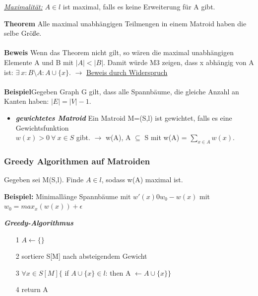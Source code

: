 \underline{\textit{Maximalität:}} $A \in l$ ist maximal, falls es keine Erweiterung für A gibt. \newline

\textbf{Theorem} \newline Alle maximal unabhängigen Teilmengen in einem Matroid haben die selbe Größe.
\\\\
\textbf{Beweis} \newline Wenn das Theorem nicht gilt, so wären die maximal unabhängigen Elemente A und B mit $|A| < |B|$. Damit würde M3 zeigen, dass x abhängig von A ist: $\exists\ x: B\setminus A: A \cup \{x\}$. $\rightarrow$ \underline{Beweis durch Widerspruch}
\\\\
\textbf{Beispiel}\newline Gegeben Graph G gilt, dass alle Spannbäume, die gleiche Anzahl an Kanten haben: $|E| = |V| - 1$. \newline
\begin{itemize}
	\item \textbf{\textit{gewichtetes Matroid}} \newline Ein Matroid M=(S,l) ist gewichtet, falls es eine Gewichtsfunktion\\$w(x) > 0\ \forall\ x \in S$ gibt. $\rightarrow$ w(A), A $\subseteq$ S mit w(A) = $\displaystyle \sum_{x \in A} w(x)$.
\end{itemize}

\subsubsection{Greedy Algorithmen auf Matroiden}

Gegeben sei M(S,l). Finde $A \in l$, sodass w(A) maximal ist.\newline

\textbf{Beispiel:} Minimallänge Spannbäume mit \newline $w'(x) 0 w_0 - w(x)$ mit $w_0 = max_{x}(w(x)) + \epsilon$ \newline

\textbf{\textit{Greedy-Algorithmus}}
\begin{itemize}
	\item[1] $A \leftarrow \{ \}$
	\item[2] sortiere S[M] nach absteigendem Gewicht
	\item[3] $\forall x \in S[M] \{$ if $A\cup \{x\} \in l$: then A $\leftarrow A \cup \{x\}\}$
	\item[4] return A
\end{itemize}


